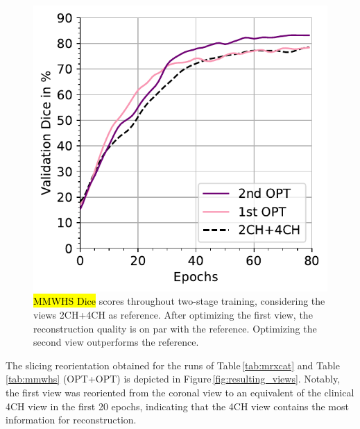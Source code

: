         \begin{figure}[H]

     \includegraphics[width=.4\linewidth]{figures/mmwhs_stage_dices.pdf}
        \caption{
        \hl{MMWHS Dice} %
        scores throughout two-stage training, considering the views 2CH+4CH as reference. After optimizing the first view, the reconstruction quality is on par with the reference. Optimizing the second view outperforms the reference.}
        \label{fig:mmwhs_stage_dices}
    \end{figure}

    The slicing reorientation obtained for the runs of Table\,\ref{tab:mrxcat} and Table \,\ref{tab:mmwhs} (OPT+OPT) is depicted in Figure\,\ref{fig:resulting_views}. Notably, the first view was reoriented from the coronal view to an equivalent of the clinical 4CH view in the first 20 epochs, indicating that the 4CH view contains the most information for reconstruction.

